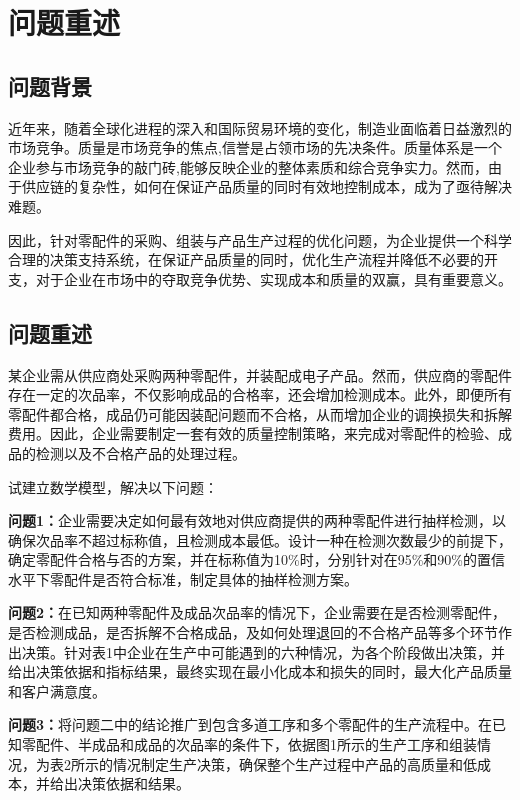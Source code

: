 \documentclass[withoutpreface,bwprint]{cumcmthesis} %
\begin{document}


\section{问题重述}

\subsection{问题背景}

近年来，随着全球化进程的深入和国际贸易环境的变化，制造业面临着日益激烈的市场竞争。质量是市场竞争的焦点,信誉是占领市场的先决条件。质量体系是一个企业参与市场竞争的敲门砖,能够反映企业的整体素质和综合竞争实力。\cite{魏富选2010汽车电子零部件企业的产品质量观}然而，由于供应链的复杂性，如何在保证产品质量的同时有效地控制成本，成为了亟待解决难题。

因此，针对零配件的采购、组装与产品生产过程的优化问题，为企业提供一个科学合理的决策支持系统，在保证产品质量的同时，优化生产流程并降低不必要的开支，对于企业在市场中的夺取竞争优势、实现成本和质量的双赢，具有重要意义。

\subsection{问题重述}

某企业需从供应商处采购两种零配件，并装配成电子产品。然而，供应商的零配件存在一定的次品率，不仅影响成品的合格率，还会增加检测成本。此外，即便所有零配件都合格，成品仍可能因装配问题而不合格，从而增加企业的调换损失和拆解费用。因此，企业需要制定一套有效的质量控制策略，来完成对零配件的检验、成品的检测以及不合格产品的处理过程。

试建立数学模型，解决以下问题：

\textbf{问题1：}企业需要决定如何最有效地对供应商提供的两种零配件进行抽样检测，以确保次品率不超过标称值，且检测成本最低。设计一种在检测次数最少的前提下，确定零配件合格与否的方案，并在标称值为10\%时，分别针对在95\%和90\%的置信水平下零配件是否符合标准，制定具体的抽样检测方案。

\textbf{问题2：}在已知两种零配件及成品次品率的情况下，企业需要在是否检测零配件，是否检测成品，是否拆解不合格成品，及如何处理退回的不合格产品等多个环节作出决策。针对表1中企业在生产中可能遇到的六种情况，为各个阶段做出决策，并给出决策依据和指标结果，最终实现在最小化成本和损失的同时，最大化产品质量和客户满意度。

\textbf{问题3：}将问题二中的结论推广到包含多道工序和多个零配件的生产流程中。在已知零配件、半成品和成品的次品率的条件下，依据图1所示的生产工序和组装情况，为表2所示的情况制定生产决策，确保整个生产过程中产品的高质量和低成本，并给出决策依据和结果。
\end{document}
